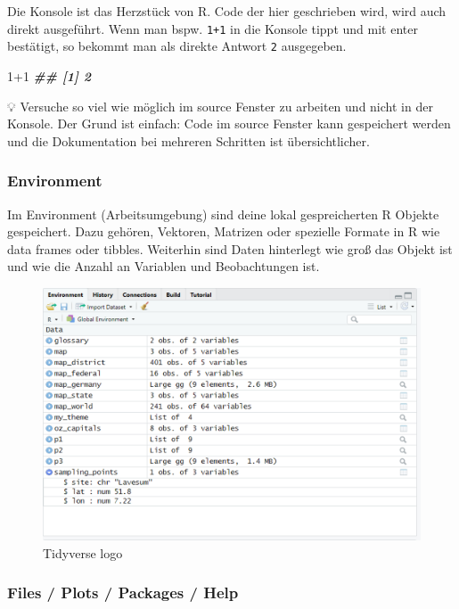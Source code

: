 \documentclass[
]{article}
\newenvironment{Shaded}{\begin{snugshade}}{\end{snugshade}}
\newcommand{\DecValTok}[1]{\textcolor[rgb]{0.00,0.00,0.81}{#1}}
\newcommand{\DocumentationTok}[1]{\textcolor[rgb]{0.56,0.35,0.01}{\textbf{\textit{#1}}}}
\newcommand{\SpecialCharTok}[1]{\textcolor[rgb]{0.00,0.00,0.00}{#1}}
\begin{document}
Die Konsole ist das Herzstück von R. Code der hier geschrieben wird, wird auch direkt ausgeführt. Wenn man bspw. \texttt{1+1} in die Konsole tippt und mit enter bestätigt, so bekommt man als direkte Antwort \texttt{2} ausgegeben.

\begin{Shaded}
\begin{Highlighting}[]
\DecValTok{1}\SpecialCharTok{+}\DecValTok{1}
\DocumentationTok{\#\# [1] 2}
\end{Highlighting}
\end{Shaded}

💡 Versuche so viel wie möglich im source Fenster zu arbeiten und nicht in der Konsole. Der Grund ist einfach: Code im source Fenster kann gespeichert werden und die Dokumentation bei mehreren Schritten ist übersichtlicher.

\hypertarget{environment}{%
\subsubsection{Environment}\label{environment}}

Im Environment (Arbeitsumgebung) sind deine lokal gespreicherten R Objekte gespeichert. Dazu gehören, Vektoren, Matrizen oder spezielle Formate in R wie data frames oder tibbles. Weiterhin sind Daten hinterlegt wie groß das Objekt ist und wie die Anzahl an Variablen und Beobachtungen ist.

\begin{figure}

{\centering \includegraphics[width=0.5\linewidth]{images/008} 

}

\caption{Tidyverse logo}\label{fig:unnamed-chunk-14}
\end{figure}

\hypertarget{files-plots-packages-help}{%
\subsubsection{Files / Plots / Packages / Help}\label{files-plots-packages-help}}
\end{document}
